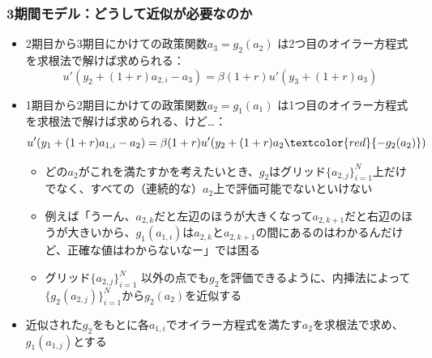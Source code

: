 \documentclass[unicode,9pt]{beamer}%
\begin{document}
\begin{frame}\frametitle{3期間モデル：どうして近似が必要なのか}
  \begin{itemize}
    \item 2期目から3期目にかけての政策関数$a_3 = g_2(a_2)$ は2つ目のオイラー方程式を求根法で解けば求められる：
      $$
      u'(y_2 + (1 + r) a_{2, i} - a_3) = \beta (1 + r) u'(y_3 + (1 + r) a_3)
      $$
    \item 1期目から2期目にかけての政策関数$a_2 = g_1(a_1)$ は1つ目のオイラー方程式を求根法で解けば求められる、けど\dots：
      $$
      u'(y_1 + (1 + r) a_{1, i} - a_2) = \beta (1 + r) u'(y_2 + (1 + r) a_2 \textcolor{red}{- g_2(a_2)})
      $$
      \begin{itemize}
        \item どの$a_2$がこれを満たすかを考えたいとき、$g_2$はグリッド$\{a_{2, j}\}_{i=1}^N$上だけでなく、すべての（連続的な）$a_2$上で評価可能でないといけない
        \item 例えば「うーん、$a_{2, k}$だと左辺のほうが大きくなって$a_{2, k+1}$だと右辺のほうが大きいから、$g_1(a_{1, i})$は$a_{2, k}$と$a_{2, k+1}$の間にあるのはわかるんだけど、正確な値はわからないなー」では困る
        \item グリッド$\{a_{2, j}\}_{i=1}^N$ 以外の点でも$g_2$を評価できるように、内挿法によって$\{g_2(a_{2, j})\}_{i=1}^N$から$g_2(a_2)$を近似する
      \end{itemize}
    \item 近似された$g_2$をもとに各$a_{1, i}$でオイラー方程式を満たす$a_2$を求根法で求め、$g_1(a_{1, j})$とする
  \end{itemize}
\end{frame}
\end{document}
